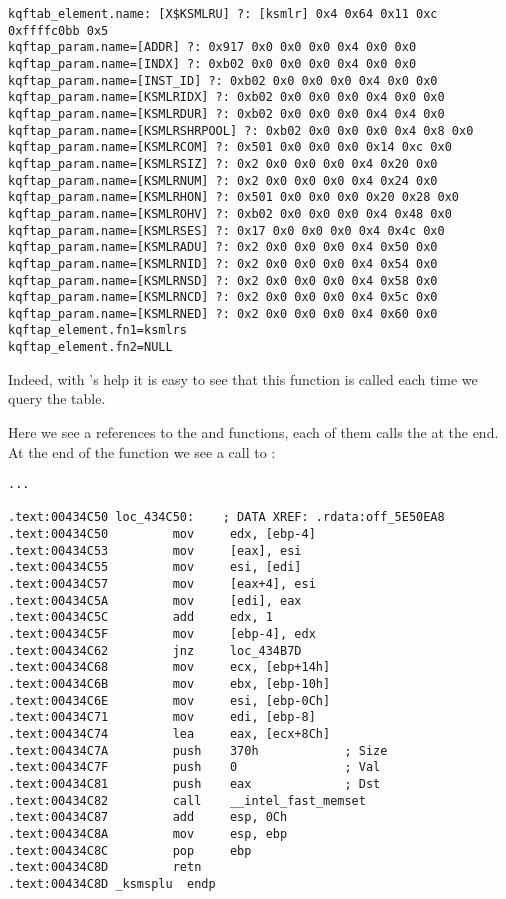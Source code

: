 \begin{lstlisting}[caption=Result of \OracleTablesName]
kqftab_element.name: [X$KSMLRU] ?: [ksmlr] 0x4 0x64 0x11 0xc 0xffffc0bb 0x5
kqftap_param.name=[ADDR] ?: 0x917 0x0 0x0 0x0 0x4 0x0 0x0
kqftap_param.name=[INDX] ?: 0xb02 0x0 0x0 0x0 0x4 0x0 0x0
kqftap_param.name=[INST_ID] ?: 0xb02 0x0 0x0 0x0 0x4 0x0 0x0
kqftap_param.name=[KSMLRIDX] ?: 0xb02 0x0 0x0 0x0 0x4 0x0 0x0
kqftap_param.name=[KSMLRDUR] ?: 0xb02 0x0 0x0 0x0 0x4 0x4 0x0
kqftap_param.name=[KSMLRSHRPOOL] ?: 0xb02 0x0 0x0 0x0 0x4 0x8 0x0
kqftap_param.name=[KSMLRCOM] ?: 0x501 0x0 0x0 0x0 0x14 0xc 0x0
kqftap_param.name=[KSMLRSIZ] ?: 0x2 0x0 0x0 0x0 0x4 0x20 0x0
kqftap_param.name=[KSMLRNUM] ?: 0x2 0x0 0x0 0x0 0x4 0x24 0x0
kqftap_param.name=[KSMLRHON] ?: 0x501 0x0 0x0 0x0 0x20 0x28 0x0
kqftap_param.name=[KSMLROHV] ?: 0xb02 0x0 0x0 0x0 0x4 0x48 0x0
kqftap_param.name=[KSMLRSES] ?: 0x17 0x0 0x0 0x0 0x4 0x4c 0x0
kqftap_param.name=[KSMLRADU] ?: 0x2 0x0 0x0 0x0 0x4 0x50 0x0
kqftap_param.name=[KSMLRNID] ?: 0x2 0x0 0x0 0x0 0x4 0x54 0x0
kqftap_param.name=[KSMLRNSD] ?: 0x2 0x0 0x0 0x0 0x4 0x58 0x0
kqftap_param.name=[KSMLRNCD] ?: 0x2 0x0 0x0 0x0 0x4 0x5c 0x0
kqftap_param.name=[KSMLRNED] ?: 0x2 0x0 0x0 0x0 0x4 0x60 0x0
kqftap_element.fn1=ksmlrs
kqftap_element.fn2=NULL
\end{lstlisting}

Indeed, with \tracer's help it is easy to see that this function is called each 
time we query the  table.

Here we see a references to the  and  functions, each of 
them calls the  at the end.
At the end of the  function we see 
a call to :

\begin{lstlisting}[caption=ksm.o]
...

.text:00434C50 loc_434C50:    ; DATA XREF: .rdata:off_5E50EA8
.text:00434C50         mov     edx, [ebp-4]
.text:00434C53         mov     [eax], esi
.text:00434C55         mov     esi, [edi]
.text:00434C57         mov     [eax+4], esi
.text:00434C5A         mov     [edi], eax
.text:00434C5C         add     edx, 1
.text:00434C5F         mov     [ebp-4], edx
.text:00434C62         jnz     loc_434B7D
.text:00434C68         mov     ecx, [ebp+14h]
.text:00434C6B         mov     ebx, [ebp-10h]
.text:00434C6E         mov     esi, [ebp-0Ch]
.text:00434C71         mov     edi, [ebp-8]
.text:00434C74         lea     eax, [ecx+8Ch]
.text:00434C7A         push    370h            ; Size
.text:00434C7F         push    0               ; Val
.text:00434C81         push    eax             ; Dst
.text:00434C82         call    __intel_fast_memset
.text:00434C87         add     esp, 0Ch
.text:00434C8A         mov     esp, ebp
.text:00434C8C         pop     ebp
.text:00434C8D         retn
.text:00434C8D _ksmsplu  endp
\end{lstlisting}

